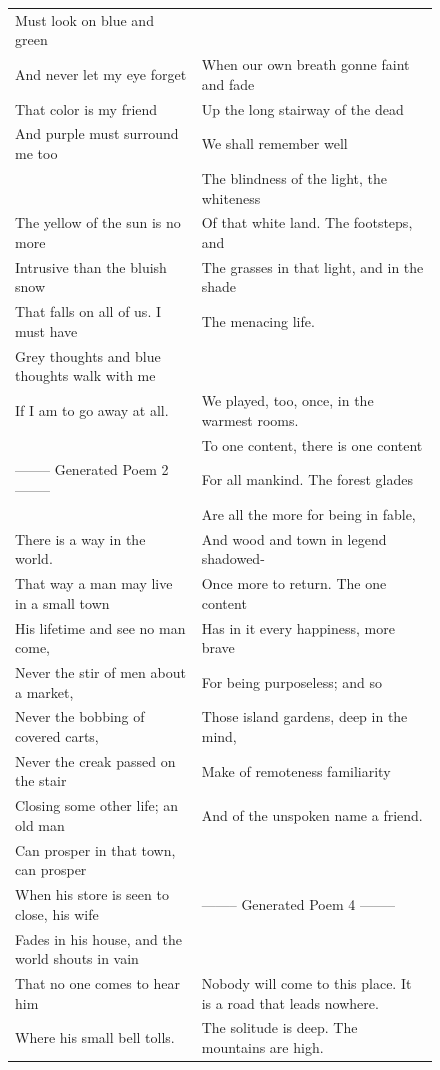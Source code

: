 \begin{figure}
{\begin{center}
\begin{tabular}{l l}
Must look on blue and green & \\
And never let my eye forget & When our own breath gonne faint and fade\\
That color is my friend & Up the long stairway of the dead\\
And purple must surround me too & We shall remember well\\
 & The blindness of the light, the whiteness\\
The yellow of the sun is no more & Of that white land. The footsteps, and\\
Intrusive than the bluish snow & The grasses in that light, and in the shade\\
That falls on all of us. I must have & The menacing life.\\
Grey thoughts and blue thoughts walk with me & \\
If I am to go away at all. & We played, too, once, in the warmest rooms.\\
 & To one content, there is one content\\
 -------- Generated Poem 2  --------  & For all mankind. The forest glades\\
 & Are all the more for being in fable,\\
There is a way in the world. & And wood and town in legend shadowed-\\
That way a man may live in a small town & Once more to return. The one content\\
His lifetime and see no man come, & Has in it every happiness, more brave\\
Never the stir of men about a market, & For being purposeless; and so\\
Never the bobbing of covered carts, & Those island gardens, deep in the mind,\\
Never the creak passed on the stair & Make of remoteness familiarity\\
Closing some other life; an old man & And of the unspoken name a friend.\\
Can prosper in that town, can prosper & \\
When his store is seen to close, his wife &  -------- Generated Poem 4  --------  \\
Fades in his house, and the world shouts in vain & \\
That no one comes to hear him & Nobody will come to this place. It is a road that leads nowhere.\\
Where his small bell tolls. & The solitude is deep. The mountains are high.\\

\end{tabular}
\end{center}}
\end{figure}
